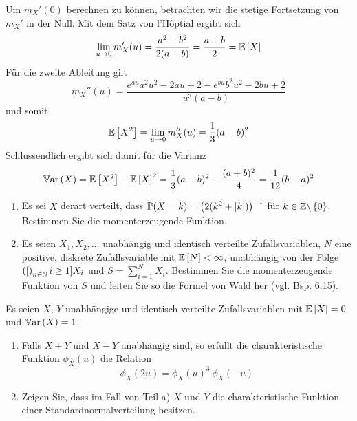 \begin{exercisePage}[Normalverteilung]
\begin{enumerate}[label=(zu \alph*), leftmargin=*]
\begin{equation*}
		\end{equation*}
		Um $m_X'(0)$ berechnen zu können, betrachten wir die stetige Fortsetzung von $m_X'$ in der Null. Mit dem Satz von l'Hôptial ergibt sich
		\begin{equation*}
			\lim_{u \to 0} m_X'(u) = \frac{a^2 - b^2}{2 (a-b)} = \frac{a+b}{2} = \EW[X]
		\end{equation*}
		Für die zweite Ableitung gilt
		\begin{equation*}
			m_X''(u) = \frac{e^{a u} {a^2 u^2 - 2 a u + 2} - e^{b u} {b^2 u^2 - 2 b u + 2}}{u^3(a - b)}
		\end{equation*}
		und somit 
		\begin{equation*}
			\EW[X^2] = \lim_{u \to 0} m_X''(u) = \frac{1}{3} (a-b)^2
		\end{equation*}
		Schlussendlich ergibt sich damit für die Varianz
		\begin{equation*}
			\Var[X] = \EW[X^2] - \EW[X]^2 = \frac{1}{3} (a-b)^2 - \frac{(a+b)^2}{4} = \frac{1}{12} (b-a)^2 
		\end{equation*}
	\end{enumerate}

	\begin{homework}
		\begin{enumerate}[leftmargin=*, nolistsep]
			\item Es sei $X$ derart verteilt, dass $\P(X = k) = \left( 2 (k^2 + \abs{k})\right)^{-1}$ für $k \in \Z \ohneNull$. 
			Bestimmen Sie die momenterzeugende Funktion.
			\item Es seien $X_1, X_2, \dots$ unabhängig und identisch verteilte Zufallsvariablen, $N$ eine positive, diskrete Zufallsvariable mit $\EW[N] < \infty$, unabhängig von der Folge $\folge[i \ge 1]{X_i}$ und $S = \sum_{i = 1}^N X_i$. Bestimmen Sie die momenterzeugende Funktion von $S$ und leiten Sie so die Formel von Wald her (vgl. Bsp. 6.15).
		\end{enumerate}
	\end{homework}

	\begin{homework}
		Es seien $X$, $Y$ unabhängige und identisch verteilte Zufallsvariablen mit $\EW[X] = 0$ und $\Var[X] = 1$.
		\begin{enumerate}[leftmargin=*, nolistsep]
			\item Falls $X+Y$ und $X-Y$ unabhängig sind, so erfüllt die charakteristische Funktion $\phi_X(u)$ die Relation
			\begin{equation*}
				\phi_X(2u) = \phi_X(u)^3 \ \phi_X(-u)
			\end{equation*}
			\item Zeigen Sie, dass im Fall von Teil a) $X$ und $Y$ die charakteristische Funktion einer Standardnormalverteilung besitzen.
		\end{enumerate}
	\end{homework}
\end{exercisePage}